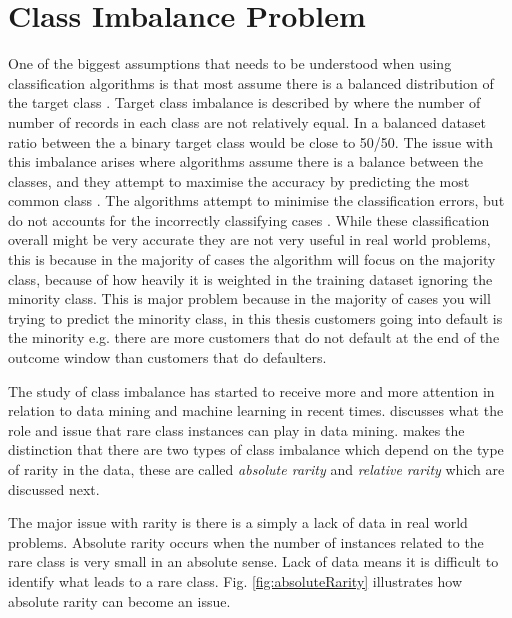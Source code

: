 \section{Class Imbalance Problem}
One of the biggest assumptions that needs to be understood when using classification algorithms is that most assume there is a balanced distribution of the target class \citep{japkowicz_class_2000}. Target class imbalance is described by  \citep{chawla_smote:_2002} where the number of number of records in each class are not relatively equal. In a balanced dataset ratio between the a binary target class would be close to 50/50. The issue with this imbalance arises where algorithms assume there is a balance between the classes, and they attempt to maximise the accuracy by predicting the most common class \citep{drummond_severe_2005}. The algorithms attempt to minimise the classification errors, but do not accounts for the incorrectly classifying cases \citep{seiffert_improving_2009}. While these classification overall might be very accurate they are not very useful in real world problems, this is because in the majority of cases the algorithm will focus on the majority class, because of how heavily it is weighted in the training dataset ignoring the minority class. This is major problem because in the majority of cases you will trying to predict the minority class, in this thesis customers going into default is the minority e.g. there are more customers that do not default at the end of the outcome window than customers that do defaulters.

The study of class imbalance has started to receive more and more attention in relation to data mining and machine learning in recent times. \cite{weiss_mining_2004} discusses what the role and issue that rare class instances can play in data mining. \cite{weiss_mining_2004} makes the distinction that there are two types of class imbalance which depend on the type of rarity in the data, these are called \textit{absolute rarity} and \textit{relative rarity} which are discussed next.

The major issue with rarity is there is a simply a lack of data in real world problems. Absolute rarity occurs when the number of instances related to the rare class is very small in an absolute sense. Lack of data means it is difficult to identify what leads to a rare class. Fig. \ref{fig:absoluteRarity} illustrates how absolute rarity can become an issue.

